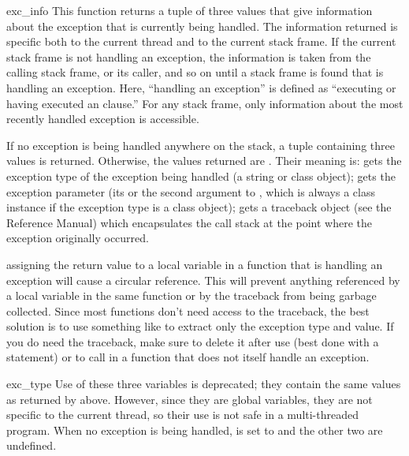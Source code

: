 \begin{funcdesc}{exc_info}{}
This function returns a tuple of three values that give information
about the exception that is currently being handled.  The information
returned is specific both to the current thread and to the current
stack frame.  If the current stack frame is not handling an exception,
the information is taken from the calling stack frame, or its caller,
and so on until a stack frame is found that is handling an exception.
Here, ``handling an exception'' is defined as ``executing or having
executed an  clause.''  For any stack frame, only
information about the most recently handled exception is accessible.

If no exception is being handled anywhere on the stack, a tuple
containing three  values is returned.  Otherwise, the
values returned are
.
Their meaning is:  gets the exception type of the exception
being handled (a string or class object);  gets the
exception parameter (its  or the second argument
to , which is always a class instance if the exception
type is a class object);  gets a traceback object (see
the Reference Manual) which encapsulates the call stack at the point
where the exception originally occurred.

 assigning the  return value to a
local variable in a function that is handling an exception will cause
a circular reference. This will prevent anything referenced by a local
variable in the same function or by the traceback from being garbage
collected.  Since most functions don't need access to the traceback,
the best solution is to use something like
to extract only the exception type and value.  If you do need the
traceback, make sure to delete it after use (best done with a
 statement) or to call  in a
function that does not itself handle an exception.
\end{funcdesc}

\begin{datadesc}{exc_type}
Use of these three variables is deprecated; they contain the same
values as returned by  above.  However, since
they are global variables, they are not specific to the current
thread, so their use is not safe in a multi-threaded program.  When no
exception is being handled,  is set to 
and the other two are undefined.
\end{datadesc}

